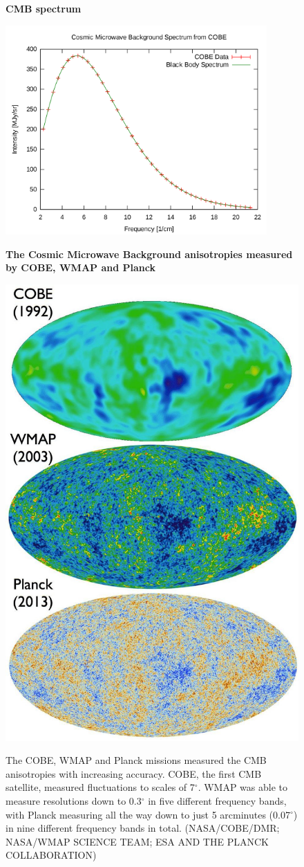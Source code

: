 \documentclass{article}
\begin{document}
\begin{figure}
\centering
    \textbf{CMB spectrum}\par\medskip
\centering
   {\includegraphics[height=8cm]{blackbody.png}}
\caption{}
\label{cobe_blackbody}
\end{figure}


\begin{figure}
\centering
    \textbf{The Cosmic Microwave Background anisotropies measured by COBE, WMAP and Planck}\par\medskip
\centering
   {\includegraphics[width=.45\textwidth]{cobe_wmap_planck.jpg}}


\caption{The COBE, WMAP and Planck missions measured the CMB anisotropies with increasing accuracy. COBE, the first CMB satellite, measured fluctuations to scales of 7$^\circ$. WMAP was able to measure resolutions down to 0.3$^\circ$ in five different frequency bands, with Planck measuring all the way down to just 5 arcminutes (0.07$^\circ$) in nine different frequency bands in total.  (NASA/COBE/DMR; NASA/WMAP SCIENCE TEAM; ESA AND THE PLANCK COLLABORATION)}
\label{cobe_wmap_planck}
\end{figure}
\end{document}
